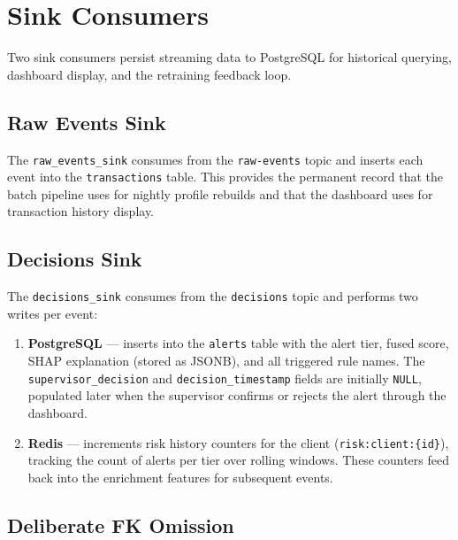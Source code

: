 \section{Sink Consumers}
\label{sec:sinks}

Two sink consumers persist streaming data to PostgreSQL for historical
querying, dashboard display, and the retraining feedback loop.

\subsection{Raw Events Sink}

The \texttt{raw\_events\_sink} consumes from the \texttt{raw-events} topic
and inserts each event into the \texttt{transactions} table. This provides the
permanent record that the batch pipeline uses for nightly profile rebuilds
and that the dashboard uses for transaction history display.

\subsection{Decisions Sink}

The \texttt{decisions\_sink} consumes from the \texttt{decisions} topic and
performs two writes per event:

\begin{enumerate}
    \item \textbf{PostgreSQL} --- inserts into the \texttt{alerts} table with
          the alert tier, fused score, SHAP explanation (stored as JSONB), and
          all triggered rule names. The \texttt{supervisor\_decision} and
          \texttt{decision\_timestamp} fields are initially \texttt{NULL},
          populated later when the supervisor confirms or rejects the alert
          through the dashboard.
    \item \textbf{Redis} --- increments risk history counters for the client
          (\texttt{risk:client:\{id\}}), tracking the count of alerts per tier
          over rolling windows. These counters feed back into the enrichment
          features for subsequent events.
\end{enumerate}

\subsection{Deliberate FK Omission}

